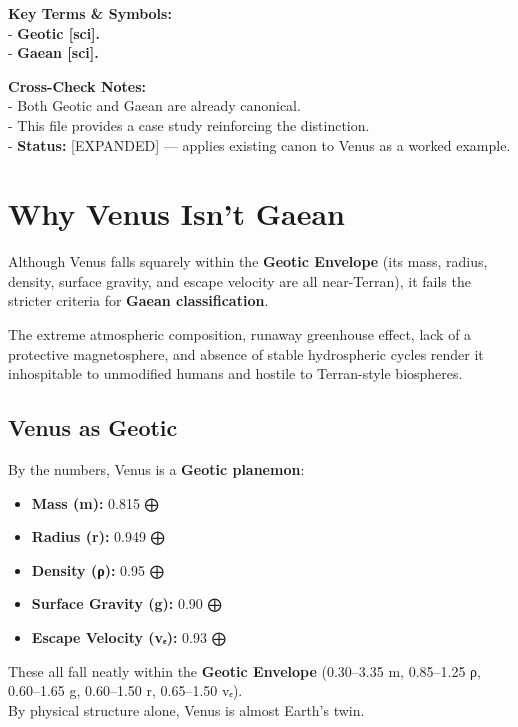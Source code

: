 \documentclass[
  letterpaper,
]{book}
\providecommand{\tightlist}{%
  \setlength{\itemsep}{0pt}\setlength{\parskip}{0pt}}
\begin{document}
\textbf{Key Terms \& Symbols:}\\
- \textbf{Geotic {[}sci{]}.}\\
- \textbf{Gaean {[}sci{]}.}

\textbf{Cross-Check Notes:}\\
- Both Geotic and Gaean are already canonical.\\
- This file provides a case study reinforcing the distinction.\\
- \textbf{Status:} {[}EXPANDED{]} --- applies existing canon to Venus as
a worked example.

\chapter{Why Venus Isn't Gaean}\label{why-venus-isnt-gaean}

Although Venus falls squarely within the \textbf{Geotic Envelope} (its
mass, radius, density, surface gravity, and escape velocity are all
near-Terran), it fails the stricter criteria for \textbf{Gaean
classification}.

The extreme atmospheric composition, runaway greenhouse effect, lack of
a protective magnetosphere, and absence of stable hydrospheric cycles
render it inhospitable to unmodified humans and hostile to Terran-style
biospheres.

\section{Venus as Geotic}\label{venus-as-geotic}

By the numbers, Venus is a \textbf{Geotic planemon}:

\begin{itemize}
\tightlist
\item
  \textbf{Mass (m):} 0.815 ⨁\\
\item
  \textbf{Radius (r):} 0.949 ⨁\\
\item
  \textbf{Density (ρ):} 0.95 ⨁\\
\item
  \textbf{Surface Gravity (g):} 0.90 ⨁\\
\item
  \textbf{Escape Velocity (vₑ):} 0.93 ⨁
\end{itemize}

These all fall neatly within the \textbf{Geotic Envelope} (0.30--3.35 m,
0.85--1.25 ρ, 0.60--1.65 g, 0.60--1.50 r, 0.65--1.50 vₑ).\\
By physical structure alone, Venus is almost Earth's twin.
\end{document}
